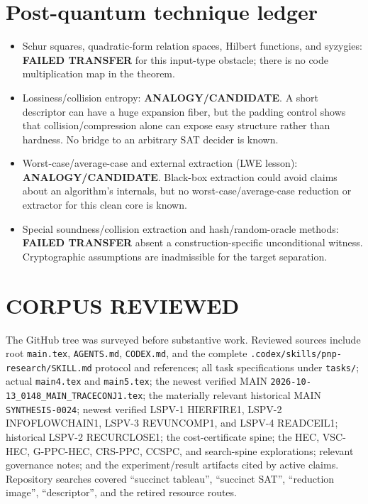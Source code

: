 \documentclass[11pt]{article}
\begin{document}
\section*{Post-quantum technique ledger}
\begin{itemize}
\item Schur squares, quadratic-form relation spaces, Hilbert functions, and
syzygies: \textbf{FAILED TRANSFER} for this input-type obstacle; there is no
code multiplication map in the theorem.
\item Lossiness/collision entropy: \textbf{ANALOGY/CANDIDATE}.  A short
descriptor can have a huge expansion fiber, but the padding control shows that
collision/compression alone can expose easy structure rather than hardness.
No bridge to an arbitrary SAT decider is known.
\item Worst-case/average-case and external extraction (LWE lesson):
\textbf{ANALOGY/CANDIDATE}.  Black-box extraction could avoid claims about an
algorithm's internals, but no worst-case/average-case reduction or extractor
for this clean core is known.
\item Special soundness/collision extraction and hash/random-oracle methods:
\textbf{FAILED TRANSFER} absent a construction-specific unconditional witness.
Cryptographic assumptions are inadmissible for the target separation.
\end{itemize}

\section*{CORPUS REVIEWED}
The GitHub tree was surveyed before substantive work.  Reviewed sources include
root \texttt{main.tex}, \texttt{AGENTS.md}, \texttt{CODEX.md}, and the complete
\texttt{.codex/skills/pnp-research/SKILL.md} protocol and references; all task
specifications under \texttt{tasks/}; actual \texttt{main4.tex} and
\texttt{main5.tex}; the newest verified MAIN
\texttt{2026-10-13\_0148\_MAIN\_TRACECONJ1.tex}; the materially relevant
historical MAIN \texttt{SYNTHESIS-0024}; newest verified LSPV-1 HIERFIRE1,
LSPV-2 INFOFLOWCHAIN1, LSPV-3 REVUNCOMP1, and LSPV-4 READCEIL1; historical
LSPV-2 RECURCLOSE1; the cost-certificate spine; the HEC, VSC-HEC, G-PPC-HEC,
CRS-PPC, CCSPC, and search-spine explorations; relevant governance notes; and
the experiment/result artifacts cited by active claims.  Repository searches
covered ``succinct tableau'', ``succinct SAT'', ``reduction image'',
``descriptor'', and the retired resource routes.
\end{document}
